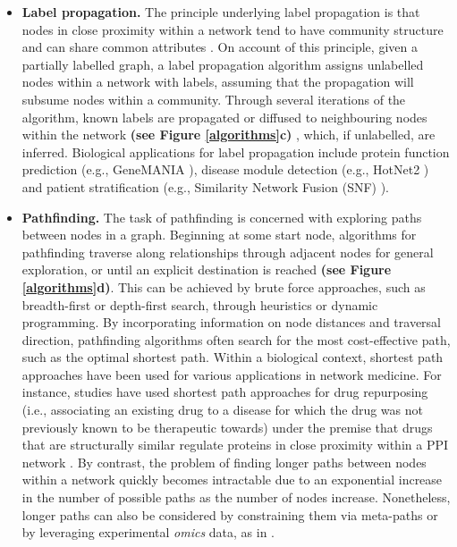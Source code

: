 \begin{itemize}
    \item \textbf{Label propagation.} The principle underlying label propagation is that nodes in close proximity within a network tend to have community structure and can share common attributes \parencite{cowen2017}. On account of this principle, given a partially labelled graph, a label propagation algorithm assigns unlabelled nodes within a network with labels, assuming that the propagation will subsume nodes within a community. Through several iterations of the algorithm, known labels are propagated or diffused to neighbouring nodes within the network  \textbf{(see Figure \ref{algorithms}c)} \parencite{zhu2002}, which, if unlabelled, are inferred. Biological applications for label propagation include protein function prediction (e.g., GeneMANIA \parencite{warde2010}), disease module detection (e.g., HotNet2 \parencite{leiserson2015}) and patient stratification (e.g., Similarity Network Fusion (SNF) \parencite{wang2014}).

    \item \textbf{Pathfinding.} The task of pathfinding is concerned with exploring paths between nodes in a graph. Beginning at some start node, algorithms for pathfinding traverse along relationships through adjacent nodes for general exploration, or until an explicit destination is reached \parencite{needham2019}  \textbf{(see Figure \ref{algorithms}d)}. This can be achieved by brute force approaches, such as breadth-first or depth-first search, through heuristics or dynamic programming. By incorporating information on node distances and traversal direction, pathfinding algorithms often search for the most cost-effective path, such as the optimal shortest path. Within a biological context, shortest path approaches have been used for various applications in network medicine. For instance, studies have used shortest path approaches for drug repurposing (i.e., associating an existing drug to a disease for which the drug was not previously known to be therapeutic towards) \parencite{lee2018,yu2016,isik2015} under the premise that drugs that are structurally similar regulate proteins in close proximity within a PPI network \parencite{kotlyar2012}. By contrast, the problem of finding longer paths between nodes within a network quickly becomes intractable due to an exponential increase in the number of possible paths as the number of nodes increase. Nonetheless, longer paths can also be considered by constraining them via meta-paths or by leveraging experimental \textit{omics} data, as in \parencite{domingo2022}. 


\end{itemize}
